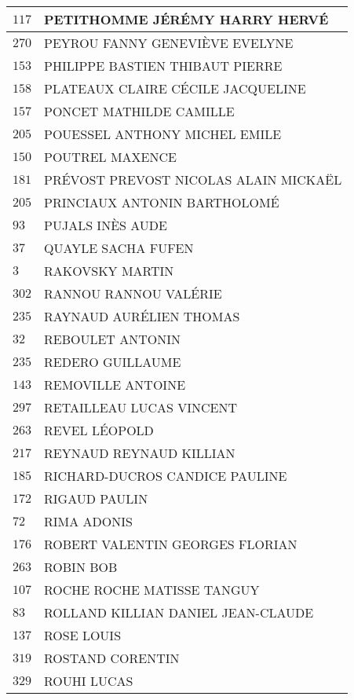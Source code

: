 \begin{xltabular}{\linewidth}{|l|X|}
    \hline
    $117$ & PETITHOMME JÉRÉMY HARRY HERVÉ \\
    \hline
    $270$ & PEYROU FANNY GENEVIÈVE EVELYNE \\
    \hline
    $153$ & PHILIPPE BASTIEN THIBAUT PIERRE \\
    \hline
    $158$ & PLATEAUX CLAIRE CÉCILE JACQUELINE \\
    \hline
    $157$ & PONCET MATHILDE CAMILLE \\
    \hline
    $205$ & POUESSEL ANTHONY MICHEL EMILE \\
    \hline
    $150$ & POUTREL MAXENCE \\
    \hline
    $181$ & PRÉVOST PREVOST NICOLAS ALAIN MICKAËL \\
    \hline
    $205$ & PRINCIAUX ANTONIN BARTHOLOMÉ \\
    \hline
    $93$ & PUJALS INÈS AUDE \\
    \hline
    $37$ & QUAYLE SACHA FUFEN \\
    \hline
    $3$ & RAKOVSKY MARTIN \\
    \hline
    $302$ & RANNOU RANNOU VALÉRIE \\
    \hline
    $235$ & RAYNAUD AURÉLIEN THOMAS \\
    \hline
    $32$ & REBOULET ANTONIN \\
    \hline
    $235$ & REDERO GUILLAUME \\
    \hline
    $143$ & REMOVILLE ANTOINE \\
    \hline
    $297$ & RETAILLEAU LUCAS VINCENT \\
    \hline
    $263$ & REVEL LÉOPOLD \\
    \hline
    $217$ & REYNAUD REYNAUD KILLIAN \\
    \hline
    $185$ & RICHARD-DUCROS CANDICE PAULINE \\
    \hline
    $172$ & RIGAUD PAULIN \\
    \hline
    $72$ & RIMA ADONIS \\
    \hline
    $176$ & ROBERT VALENTIN GEORGES FLORIAN \\
    \hline
    $263$ & ROBIN BOB \\
    \hline
    $107$ & ROCHE ROCHE MATISSE TANGUY \\
    \hline
    $83$ & ROLLAND KILLIAN DANIEL JEAN-CLAUDE \\
    \hline
    $137$ & ROSE LOUIS \\
    \hline
    $319$ & ROSTAND CORENTIN \\
    \hline
    $329$ & ROUHI LUCAS \\

\end{xltabular}

